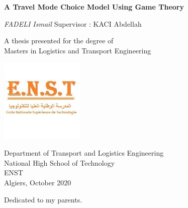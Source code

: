 \documentclass[12pt]{report}
\newenvironment{dedication}
  {\clearpage           %
   \thispagestyle{empty}%
   \vspace*{\stretch{1}}%
   \itshape             %
   \raggedleft          %
  }
  {\par %
   \vspace{\stretch{3}} %
   \clearpage           %
  }
\def\blankpage{%
      \clearpage%
      \thispagestyle{empty}%
      \addtocounter{page}{-1}%
      \null%
      \clearpage}
\begin{document}
\begin{titlepage}

   \begin{center}
   \thisfancypage{%
\setlength{\fboxsep}{10pt}\doublebox}{}
       \vspace*{1cm}
 	   \Huge
       \textbf{A Travel Mode Choice Model Using Game Theory}
		\LARGE
		
       \vspace{0.5cm}
        
            
       \vspace{1.5cm}

       \textit{FADELI Ismail}
\vfill
\normalsize
Supervisor : KACI Abdellah\\

       \vfill
       
            	\normalsize
       A thesis presented for the degree of\\
       Masters in Logistics and Transport Engineering
            
       \vspace{0.8cm}
     \begin{center}
      \includegraphics[width=4cm]{Enst_logo}
     \end{center}
     
            \Large
       Department of Transport and Logistics Engineering\\
       National High School of Technology \\
       ENST\\
       Algiers, October 2020\\
     
            
   \end{center}
   

\end{titlepage}
\blankpage
\thispagestyle{empty}
\begin{dedication}
Dedicated to my parents.

\end{dedication}
\end{document}
